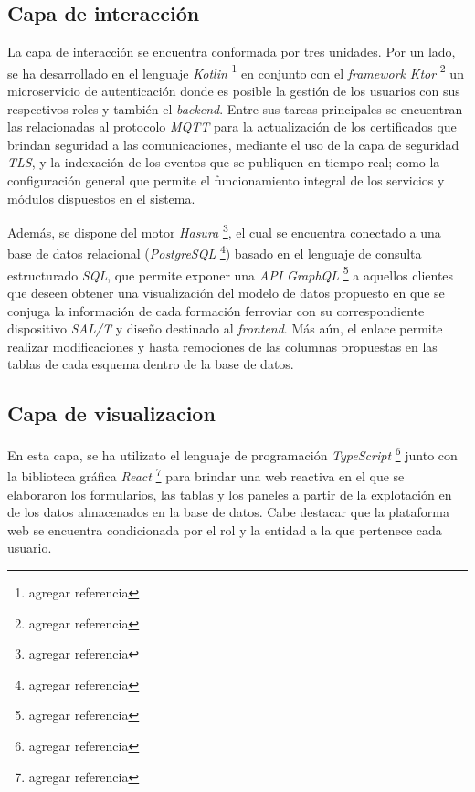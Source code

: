 \documentclass[a4paper]{IEEEtran}
\begin{document}
\subsection{Capa de interacción}

La capa de interacción se encuentra conformada por tres unidades. Por un lado, se ha desarrollado en el lenguaje \textit{Kotlin} \cite{b9} \footnote{agregar referencia} en conjunto con el \textit{framework} \textit{Ktor} \cite{b10} \footnote{agregar referencia} un microservicio de autenticación donde es posible la gestión de los usuarios con sus respectivos roles y también el \textit{backend}. Entre sus tareas principales se encuentran las relacionadas al protocolo \textit{MQTT} para la actualización de los certificados que brindan seguridad a las comunicaciones, mediante el uso de la capa de seguridad \textit{TLS}, y la indexación de los eventos que se publiquen en tiempo real; como la configuración general que permite el funcionamiento integral de los servicios y módulos dispuestos en el sistema.

Además, se dispone del motor \textit{Hasura} \cite{b11} \footnote{agregar referencia}, el cual se encuentra conectado a una base de datos relacional (\textit{PostgreSQL} \cite{b12} \footnote{agregar referencia}) basado en el lenguaje de consulta estructurado \textit{SQL}, que permite exponer una \textit{API GraphQL} \cite{b13} \footnote{agregar referencia} a aquellos clientes que deseen obtener una visualización del modelo de datos propuesto en que se conjuga la información de cada formación ferroviar con su correspondiente dispositivo \textit{SAL/T} y diseño destinado al \textit{frontend}. Más aún, el enlace permite realizar modificaciones y hasta remociones de las columnas propuestas en las tablas de cada esquema dentro de la base de datos.


\subsection{Capa de visualizacion}

En esta capa, se ha utilizato el lenguaje de programación \textit{TypeScript} \cite{b14} \footnote{agregar referencia} junto con la biblioteca gráfica \textit{React} \cite{b15} \footnote{agregar referencia} para brindar una web reactiva en el que se elaboraron los formularios, las tablas y los paneles a partir de la explotación en de los datos almacenados en la base de datos. Cabe destacar que la plataforma web se encuentra condicionada por el rol y la entidad a la que pertenece cada usuario.
\end{document}
